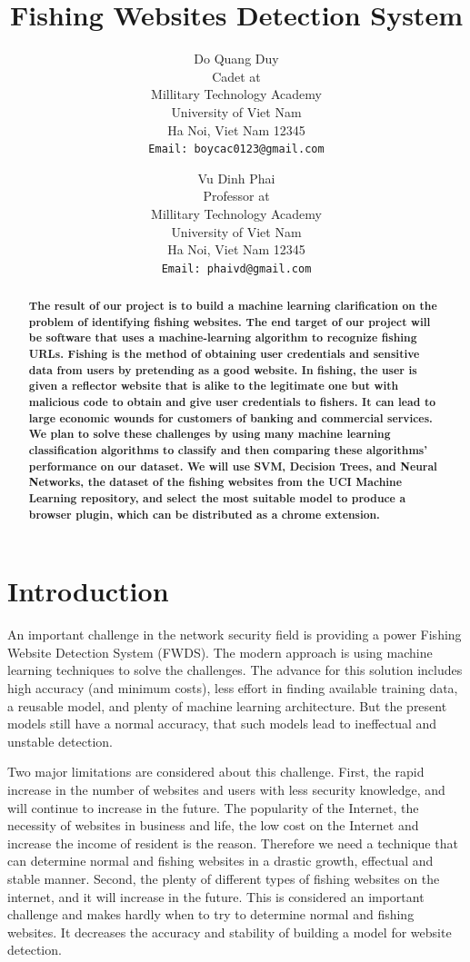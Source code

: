\documentclass[twocolumn,10pt]{article}
\title{Fishing Websites Detection System}
\author{
	Do Quang Duy\\Cadet at\\Millitary Technology Academy\\University of Viet Nam\\Ha Noi, Viet Nam 12345\\
	\texttt{Email: boycac0123@gmail.com}
	\and
	Vu Dinh Phai\\Professor at\\Millitary Technology Academy\\University of Viet Nam\\Ha Noi, Viet Nam 12345\\
	\texttt{Email: phaivd@gmail.com}
}
\begin{document}
\maketitle

\begin{abstract}
\textbf{The result of our project is to build a machine
learning clarification on the problem of identifying fishing websites. The end target of our project will be software that uses a machine-learning algorithm to recognize fishing URLs. Fishing is the method of obtaining user credentials and sensitive data from users by pretending as a good website. In fishing, the user is given a
reflector website that is alike to the legitimate one but with
malicious code to obtain and give user credentials to fishers.
It can lead to large economic wounds for customers
of banking and commercial services. We plan to solve these challenges by using many machine learning classification algorithms to classify and then comparing these algorithms' performance on our dataset. We will use SVM, Decision Trees, and Neural Networks, the dataset of the fishing websites from the UCI Machine Learning repository, and select the most suitable model to produce a browser plugin, which can be distributed as a chrome extension.}
\end{abstract}
\section{Introduction}

An important challenge in the network security field is providing a power Fishing Website Detection System (FWDS). The modern approach is using machine learning techniques to solve the challenges. The advance for this solution includes high accuracy (and minimum costs), less effort in finding available training data, a reusable model, and plenty of machine learning architecture. But the present models still have a normal accuracy, that such models lead to ineffectual and unstable detection.	

Two major limitations are considered about this challenge. First, the rapid increase in the number of websites and users with less security knowledge, and will continue to increase in the future. The popularity of the Internet,  the necessity of websites in business and life, the low cost on the Internet and increase the income of resident is the reason. Therefore we need a technique that can determine normal and fishing websites in a drastic growth, effectual and stable manner. Second, the plenty of different types of fishing websites on the internet, and it will increase in the future. This is considered an important challenge and makes hardly when to try to determine normal and fishing websites. It decreases the accuracy and stability of building a model for website detection.
\end{document}

